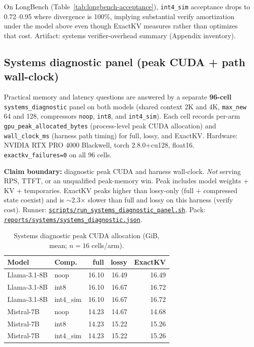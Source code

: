 \documentclass[11pt]{article}
\begin{document}
\noindent On LongBench (Table~\ref{tab:longbench-acceptance}), \texttt{int4\_sim}
acceptance drops to 0.72--0.95 where divergence is 100\%, implying substantial
verify amortization under the model above even though ExactKV measures rather than
optimizes that cost. Artifact: systems verifier-overhead summary (Appendix inventory).

\subsection{Systems diagnostic panel (peak CUDA + path wall-clock)}
Practical memory and latency questions are answered by a separate \textbf{96-cell}
\texttt{systems\_diagnostic} panel on both models (shared context 2K and 4K,
\texttt{max\_new} 64 and 128, compressors \texttt{noop}, \texttt{int8}, and
\texttt{int4\_sim}). Each cell records per-arm
\texttt{gpu\_peak\_allocated\_bytes} (process-level peak CUDA allocation) and
\texttt{wall\_clock\_ms} (harness path timing) for full, lossy, and ExactKV.
Hardware: NVIDIA RTX PRO 4000 Blackwell, torch 2.8.0+cu128, float16.
\texttt{exactkv\_failures=0} on all 96 cells.

\begin{sloppypar}
\noindent\textbf{Claim boundary:} diagnostic peak CUDA and harness wall-clock.
\emph{Not} serving RPS, TTFT, or an unqualified peak-memory win. Peak includes
model weights + KV + temporaries. ExactKV peaks higher than lossy-only (full +
compressed state coexist) and is $\sim$2.3$\times$ slower than full and lossy on this
harness (verify cost). Runner:
\href{https://github.com/utkarshg20/ExactKV/blob/main/scripts/run_systems_diagnostic_panel.sh}{\texttt{scripts/run\_systems\_diagnostic\_panel.sh}}.
Pack:
\href{https://github.com/utkarshg20/ExactKV/blob/main/reports/systems/systems_diagnostic.json}{\texttt{reports/systems/systems\_diagnostic.json}}.
\end{sloppypar}

\begin{table}[htbp]
\centering\footnotesize
\caption{Systems diagnostic peak CUDA allocation (GiB, mean; $n{=}16$ cells/arm).}
\label{tab:systems-peak-cuda}
\begin{tabular}{@{}llrrr@{}}
\toprule
Model & Comp. & full & lossy & ExactKV \\ \midrule
Llama-3.1-8B & noop & 16.10 & 16.49 & 16.49 \\
Llama-3.1-8B & int8 & 16.10 & 16.67 & 16.72 \\
Llama-3.1-8B & int4\_sim & 16.10 & 16.67 & 16.72 \\
Mistral-7B & noop & 14.23 & 14.67 & 14.68 \\
Mistral-7B & int8 & 14.23 & 15.22 & 15.26 \\
Mistral-7B & int4\_sim & 14.23 & 15.22 & 15.26 \\
\bottomrule
\end{tabular}
\end{table}
\end{document}
